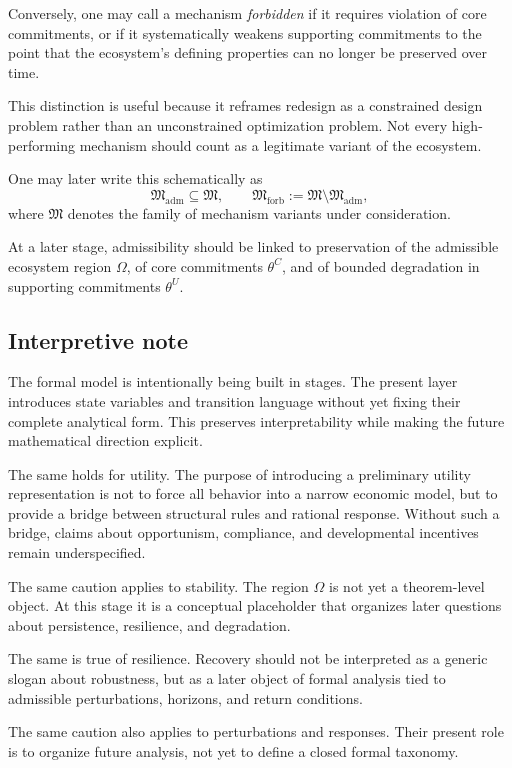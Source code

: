 \documentclass[11pt]{article}
\begin{document}
Conversely, one may call a mechanism \emph{forbidden} if it requires violation of core commitments, or if it systematically weakens supporting commitments to the point that the ecosystem's defining properties can no longer be preserved over time.

This distinction is useful because it reframes redesign as a constrained design problem rather than an unconstrained optimization problem. Not every high-performing mechanism should count as a legitimate variant of the ecosystem.

One may later write this schematically as
\[
\mathfrak{M}_{\mathrm{adm}} \subseteq \mathfrak{M},
\qquad
\mathfrak{M}_{\mathrm{forb}} := \mathfrak{M} \setminus \mathfrak{M}_{\mathrm{adm}},
\]
where \(\mathfrak{M}\) denotes the family of mechanism variants under consideration.

At a later stage, admissibility should be linked to preservation of the admissible ecosystem region \(\Omega\), of core commitments \(\theta^{C}\), and of bounded degradation in supporting commitments \(\theta^{U}\).

\subsection{Interpretive note}

The formal model is intentionally being built in stages. The present layer introduces state variables and transition language without yet fixing their complete analytical form. This preserves interpretability while making the future mathematical direction explicit.

The same holds for utility. The purpose of introducing a preliminary utility representation is not to force all behavior into a narrow economic model, but to provide a bridge between structural rules and rational response. Without such a bridge, claims about opportunism, compliance, and developmental incentives remain underspecified.

The same caution applies to stability. The region \(\Omega\) is not yet a theorem-level object. At this stage it is a conceptual placeholder that organizes later questions about persistence, resilience, and degradation.

The same is true of resilience. Recovery should not be interpreted as a generic slogan about robustness, but as a later object of formal analysis tied to admissible perturbations, horizons, and return conditions.

The same caution also applies to perturbations and responses. Their present role is to organize future analysis, not yet to define a closed formal taxonomy.
\end{document}
